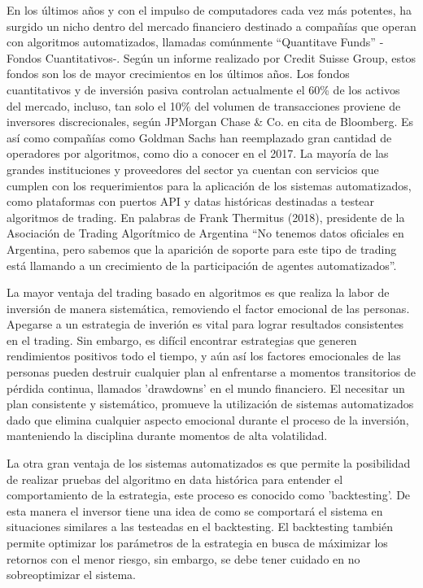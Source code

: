 \documentclass[a4paper,12pt]{Latex/Classes/PhDthesisPSnPDF}
\begin{document}
En los últimos años y con el impulso de computadores cada vez más potentes, ha surgido un nicho dentro del mercado financiero destinado a compañías que operan con algoritmos automatizados, llamadas comúnmente “Quantitave Funds” -Fondos Cuantitativos-. Según un informe realizado por Credit Suisse Group, estos fondos son los de mayor crecimientos en los últimos años. Los fondos cuantitativos y de inversión pasiva controlan actualmente el 60\% de los activos del mercado, incluso, tan solo el 10\% del volumen de transacciones proviene de inversores discrecionales, según JPMorgan Chase \& Co. en cita de Bloomberg. Es así como compañías como Goldman Sachs han reemplazado gran cantidad de operadores por algoritmos, como dio a conocer en el 2017. La mayoría de las grandes instituciones y proveedores del sector ya cuentan con servicios que cumplen con los requerimientos para la aplicación de los sistemas automatizados, como plataformas con puertos API y datas históricas destinadas a testear algoritmos de trading. En palabras de Frank Thermitus (2018), presidente de la Asociación de Trading Algorítmico de Argentina “No tenemos datos oficiales en Argentina, pero sabemos que la aparición de soporte para este tipo de trading está llamando a un crecimiento de la participación de agentes automatizados”.

La mayor ventaja del trading basado en algoritmos es que realiza la labor de inversión de manera sistemática, removiendo el factor emocional de las personas. Apegarse a un estrategia de inverión es vital para lograr resultados consistentes en el trading. Sin embargo, es difícil encontrar estrategias que generen rendimientos positivos todo el tiempo, y aún así los factores emocionales de las personas pueden destruir cualquier plan al enfrentarse a momentos transitorios de pérdida continua, llamados 'drawdowns' en el mundo financiero. El necesitar un plan consistente y sistemático, promueve la utilización de sistemas automatizados dado que elimina cualquier aspecto emocional durante el proceso de la inversión, manteniendo la disciplina durante momentos de alta volatilidad.

La otra gran ventaja de los sistemas automatizados es que permite la posibilidad de realizar pruebas del algoritmo en data histórica para entender el comportamiento de la estrategia, este proceso es conocido como 'backtesting'. De esta manera el inversor tiene una idea de como se comportará el sistema en situaciones similares a las testeadas en el backtesting. El backtesting también permite optimizar los parámetros de la estrategia en busca de máximizar los retornos con el menor riesgo, sin embargo, se debe tener cuidado en no sobreoptimizar el sistema. 
\end{document}
